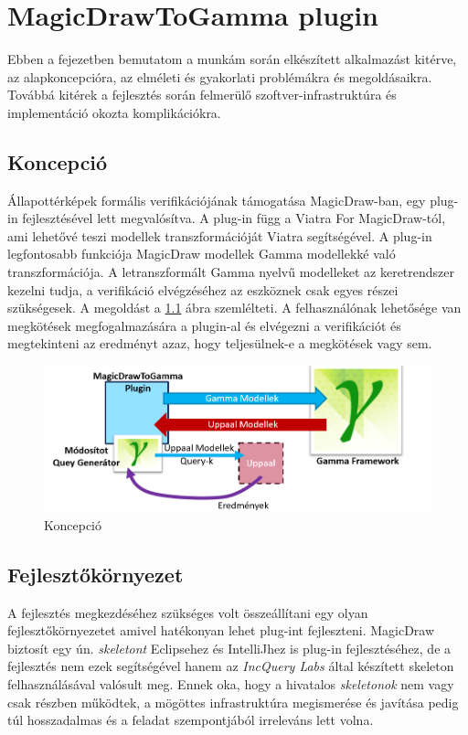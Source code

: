 \chapter{MagicDrawToGamma plugin}\label{chap:contrib}

Ebben a fejezetben bemutatom a munkám során elkészített alkalmazást kitérve, az alapkoncepcióra, az elméleti és gyakorlati problémákra és megoldásaikra. Továbbá kitérek a fejlesztés során felmerülő szoftver-infrastruktúra és implementáció okozta komplikációkra.

\section{Koncepció}
Állapottérképek formális verifikációjának támogatása MagicDraw-ban, egy plug-in fejlesztésével lett megvalósítva. A plug-in függ a Viatra For MagicDraw-tól, ami lehetővé teszi modellek transzformációját Viatra segítségével. A plug-in legfontosabb funkciója MagicDraw modellek Gamma modellekké való transzformációja. A letranszformált Gamma nyelvű modelleket az keretrendszer kezelni tudja, a verifikáció elvégzéséhez az eszköznek csak egyes részei szükségesek. A megoldást a \ref{fig:used-gamma} ábra szemlélteti. A felhasználónak lehetősége van megkötések megfogalmazására a plugin-al és elvégezni a verifikációt és megtekinteni az eredményt azaz, hogy teljesülnek-e a megkötések vagy sem.

\begin{figure}[!ht]
	\centering
	\includegraphics[keepaspectratio, width=150mm]{figures/concept.png}
	\caption{Koncepció}
	\label{fig:used-gamma}
\end{figure}

\section{Fejlesztőkörnyezet}
 A fejlesztés megkezdéséhez szükséges volt összeállítani egy olyan fejlesztőkörnyezetet amivel hatékonyan lehet plug-int fejleszteni. MagicDraw biztosít egy ún. \emph{skeletont} Eclipsehez és IntelliJhez is plug-in fejlesztéséhez, de a fejlesztés nem ezek segítségével hanem az \emph{IncQuery Labs} által készített skeleton felhasználásával valósult meg. Ennek oka, hogy a hivatalos \emph{skeletonok} nem vagy csak részben működtek, a mögöttes infrastruktúra megismerése és javítása pedig túl hosszadalmas és a feladat szempontjából irreleváns lett volna. 
 
